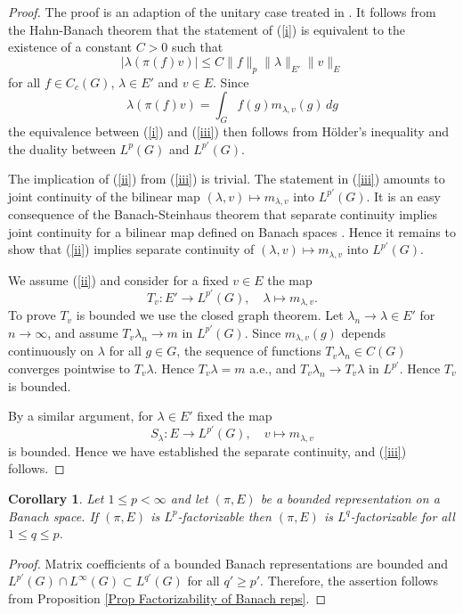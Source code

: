 \documentclass[12pt,letterpaper,titlepage,reqno]{amsart}
\theoremstyle{plain}
\newtheorem{cor}[theorem]{Corollary}
\theoremstyle{definition}
\numberwithin{equation}{section}
\begin{document}
\begin{proof} The proof is an adaption of the unitary case treated in \cite[Lemma 27]{KS}.
It follows from the Hahn-Banach theorem that the statement of (\ref{i}) is equivalent to the
existence of a constant $C>0$ such that
$$|\lambda(\pi(f)v)|\leq C\|f\|_p\|\lambda\|_{E'}\|v\|_E$$
for all $f\in C_c(G)$, $\lambda\in E'$ and $v\in E$. Since
$$\lambda(\pi(f)v)=\int_G f(g)m_{\lambda,v}(g)\,dg$$
the equivalence between (\ref{i}) and (\ref{iii}) then follows from H{ö}lder's inequality and the duality between
$L^p(G)$ and $L^{p'}(G)$.

The implication of (\ref{ii}) from (\ref{iii}) is trivial. The statement in
(\ref{iii}) amounts to joint continuity of the bilinear map $(\lambda,v)\mapsto m_{\lambda,v}$ into $L^{p'}(G)$.
It is an easy
consequence of the Banach-Steinhaus theorem that separate continuity implies joint continuity
for a bilinear map defined on Banach spaces .
Hence it remains to show that (\ref{ii}) implies
separate continuity of $(\lambda,v)\mapsto m_{\lambda,v}$ into $L^{p'}(G)$.

We assume (\ref{ii}) and consider for a fixed $v\in E$ the map
$$T_v: E'\to L^{p'}(G), \quad \lambda\mapsto m_{\lambda,v}.$$
To prove $T_v$ is bounded we use the closed graph theorem. Let $\lambda_n\to\lambda\in E'$
for $n\to\infty$, and assume $T_v\lambda_n\to m$ in $L^{p'}(G)$. Since $m_{\lambda,v}(g)$ depends
continuously on $\lambda$ for all $g\in G$, the sequence of functions $T_v\lambda_n\in C(G)$ converges pointwise
to $T_v\lambda$. Hence $T_v\lambda=m$ a.e., and $T_v\lambda_n\to T_v\lambda$ in $L^{p'}$. Hence $T_v$ is bounded.

By a similar argument, for $\lambda\in E'$ fixed  the map
$$S_\lambda: E\to L^{p'}(G), \quad v\mapsto m_{\lambda,v}$$
is bounded. Hence we have established the separate continuity, and (\ref{iii}) follows.
\end{proof}



\begin{cor}
Let $1\leq p<\infty$ and let $(\pi, E)$ be a  bounded representation on a Banach space. If $(\pi, E)$ is $L^p$-factorizable then $(\pi, E)$ is $L^q$-factorizable for all $1\leq q\leq p$.
\end{cor}

\begin{proof}
Matrix coefficients of a bounded Banach representations are bounded and $L^{p'}(G)\cap L^{\infty}(G)\subset L^{q'}(G)$ for all $q'\geq p'$. Therefore, the assertion follows from Proposition \ref{Prop Factorizability of Banach reps}.
\end{proof}
\end{document}
